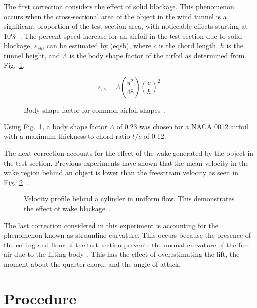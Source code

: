 \documentclass[journal,letterpaper]{IEEEtran}
\begin{document}
The first correction considers the effect of solid blockage.
This phenomenon occurs when the cross-sectional area of the object in the wind tunnel is a significant proportion of the test section area, with noticeable effects starting at 10\%~\cite{lab5r1}.
The percent speed increase for an airfoil in the test section due to solid blockage, $\varepsilon_{sb}$, can be estimated by (eqsb), where $c$ is the chord length, $h$ is the tunnel height, and $\Lambda$ is the body shape factor of the airfoil as determined from Fig.~\ref{fig:shape}.

\begin{equation}
    \varepsilon_{sb} = \Lambda\left(\frac{\pi^2}{48}\right)\left(\frac{c}{h}\right)^2
\end{equation}

\begin{figure}[H]
    \centering
    \caption{Body shape factor for common airfoil shapes~\cite{shape}.}
    \label{fig:shape}
\end{figure}

Using Fig.~\ref{fig:shape}, a body shape factor $\Lambda$ of 0.23 was chosen for a NACA 0012 airfoil with a maximum thickness to chord ratio $t/c$ of 0.12.

The next correction accounts for the effect of the wake generated by the object in the test section.
Previous experiments have shown that the mean velocity in the wake region behind an object is lower than the freestream velocity as seen in Fig.~\ref{fig:profile}~\cite{lab3}.

\begin{figure}[H]
    \centering
    \caption{Velocity profile behind a cylinder in uniform flow. This demonstrates the effect of wake blockage~\cite{lab3}.}
    \label{fig:profile}
\end{figure}

The last correction considered in this experiment is accounting for the phenomenon known as streamline curvature.
This occurs because the presence of the ceiling and floor of the test section prevents the normal curvature of the free air due to the lifting body~\cite{lab5r1}.
This has the effect of overestimating the lift, the moment about the quarter chord, and the angle of attack.


\section{Procedure}
\end{document}
